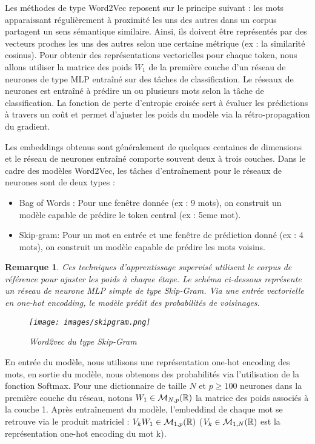 \documentclass[12pt]{article}
\newtheorem{rmq}{Remarque}
\theoremstyle{definition}
\begin{document}
	Les méthodes de type Word2Vec \cite{word2vec} reposent sur le principe suivant : les mots apparaissant régulièrement à proximité les uns des autres dans un corpus partagent un sens sémantique similaire. Ainsi, ils doivent être représentés par des vecteurs proches les uns des autres selon une certaine métrique (ex : la similarité cosinus). Pour obtenir des représentations vectorielles pour chaque token, nous allons utiliser la matrice des poids $W_1$ de la première couche d'un réseau de neurones de type MLP entraîné sur des tâches de classification. Le réseaux de neurones est entraîné à prédire un ou plusieurs mots selon la tâche de classification. La fonction de perte d'entropie croisée sert à évaluer les prédictions à travers un coût et permet d'ajuster les poids du modèle via la rétro-propagation du gradient.
	
	Les embeddings obtenus sont généralement de quelques centaines de dimensions et le réseau de neurones entraîné comporte souvent deux à trois couches. Dans le cadre des modèles Word2Vec, les tâches d'entraînement pour le réseaux de neurones sont de deux types :
	\begin{itemize}
		\item Bag of Words : Pour une fenêtre donnée (ex : 9 mots), on construit un modèle  capable de prédire le token central (ex : 5eme mot). 
		\item Skip-gram: Pour un mot en entrée et une fenêtre de prédiction donné (ex : 4 mots), on construit un modèle capable de prédire les mots voisins.
	\end{itemize}
\newpage
	\begin{rmq}
			Ces techniques d'apprentissage supervisé utilisent le corpus de référence pour ajuster les poids à chaque étape. Le schéma ci-dessous représente un réseau de neurone MLP simple de type Skip-Gram. Via une entrée vectorielle en one-hot encodding, le modèle prédit des probabilités de voisinages. \\
			
		
		\begin{figure*}[!h]
			\centering
			\texttt{[image: images/skipgram.png]}
			\caption{Word2vec du type Skip-Gram }
		\end{figure*}
	\end{rmq}
	

	
	
	En entrée du modèle, nous utilisons une représentation one-hot encoding des mots, en sortie du modèle, nous obtenons des probabilités via l'utilisation de la fonction Softmax. Pour une dictionnaire de taille $N$ et $p\geq 100$ neurones dans la première couche du réseau, notons $W_1 \in \mathcal{M}_{N,p}(\mathbb{R})$ la matrice des poids associés à la couche 1. Après entraînement du modèle, l'embeddind de chaque mot se retrouve via le produit matriciel : $V_kW_1 \in \mathcal{M}_{1,p}(\mathbb{R})$ ($V_k\in\mathcal{M}_{1,N}(\mathbb{R})$ est la représentation one-hot encoding du mot k).  
	
\end{document}
